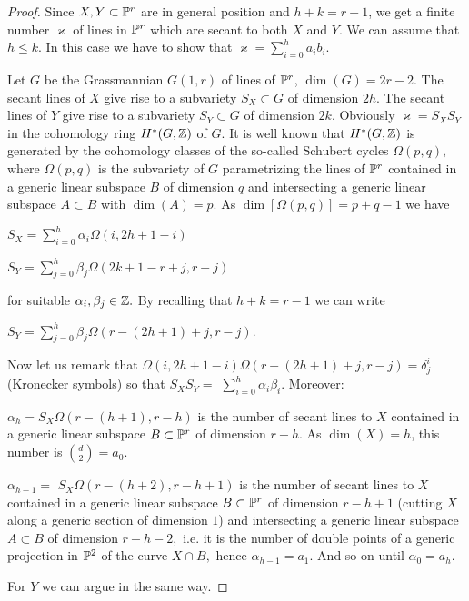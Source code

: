 \documentclass{amsart}
\theoremstyle{definition}
\begin{document}
\begin{proof}
Since $X,Y\subset\Bbb{P}^r$ are in general position and
$h+k=r-1$, we get a finite number $\varkappa $ of lines in
$\Bbb{P}^{r}$ which are secant to both $X$ and $Y$. We can assume
that $h\leq k.$ In this case we have to show that $\varkappa
=\sum\limits_{i=0}^{h}a_{i}b_{i}.$

Let $G$ be the Grassmannian $G(1,r)$ of lines of $\Bbb{P}^{r}$, $\dim
(G)=2r-2.$ The secant lines of $X$ give rise to a subvariety $S_{X}\subset G$
of dimension $2h.$ The secant lines of $Y$ give rise to a subvariety $S_{Y}\subset G$ of dimension $2k.$ Obviously $\varkappa =S_{X}S_{Y}$ in the
cohomology ring $H^{*}(G,\Bbb{Z})$ of $G.$ It is well known that $H^{*}(G,\Bbb{Z})$ is generated by the cohomology classes of the so-called
Schubert cycles $\Omega (p,q),$ where $\Omega (p,q)$ is the
subvariety of $G$ parametrizing the lines of $\Bbb{P}^{r}$ contained
in a generic linear
subspace $B$ of dimension $q$ and intersecting a generic linear subspace $A\subset B$ with $\dim (A)=p.$ As $\dim [\Omega (p,q)]=p+q-1$ we have
\begin{center}
$S_{X}=\sum\limits_{i=0}^{h}\alpha _{i}\Omega (i,2h+1-i)$

$S_{Y}=\sum\limits_{j=0}^{h}\beta _{j}\Omega (2k+1-r+j,r-j)$
\end{center}
for suitable $\alpha _{i}, \beta _{j}\in \Bbb{Z}.$ By recalling that
$h+k=r-1$ we can write
\begin{center}
$S_{Y}=\sum\limits_{j=0}^{h}\beta _{j}\Omega (r-(2h+1)+j,r-j).$
\end{center}
Now let us remark that $\Omega (i,2h+1-i)\Omega (r-(2h+1)+j,r-j)=\delta
_{j}^{i}$ (Kronecker symbols) so that $S_{X}S_{Y}=$ $\sum\limits_{i=0}^{h}\alpha _{i}\beta _{i}.$ Moreover:

$\alpha _{h}=S_{X}\Omega (r-(h+1),r-h)$ is the number of secant
lines to $X$ contained in a generic linear subspace
$B\subset\Bbb{P}^{r}$ of dimension $r-h$. As $\dim (X)=h$, this number is $\binom{d}{2}=a_{0}$.

$\alpha _{h-1}=$ $S_{X}\Omega (r-(h+2),r-h+1)$ is the number of
secant lines to $X$ contained in a generic linear subspace
$B\subset\Bbb{P}^{r}$ of dimension $r-h+1$ (cutting $X$ along a
generic section of dimension $1$) and intersecting a generic linear
subspace $A\subset B$ of dimension $r-h-2,$ i.e. it is the number of
double points of a generic projection in $\Bbb{P}^{2}$ of the curve
$X\cap B,$ hence $\alpha _{h-1}=a_{1}$. And so on until $\alpha_{0}=a_{h}$.

For $Y$ we can argue in the same way.
\end{proof}
\end{document}
